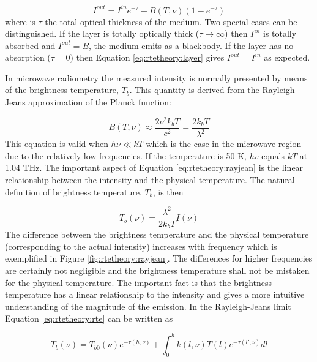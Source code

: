  \begin{equation}
   I^{out} = I^{in}e^{-\tau} + B(T,\nu)(1-e^{-\tau})
  \label{eq:rtetheory:layer}
 \end{equation}  
 where is $\tau$ the total optical thickness of the medium. Two
 special cases can be distinguished. If the layer is totally optically
 thick ($\tau \to \infty$) then $I^{in}$ is totally absorbed and
 $I^{out} = B$, the medium emits as a blackbody. If the layer has no
 absorption ($\tau=0$) then Equation \ref{eq:rtetheory:layer} gives
 $I^{out} = I^{in}$ as expected.
 
 In microwave radiometry the measured intensity is normally presented
 by means of the brightness temperature, $T_b$. This quantity is
 derived from the Rayleigh-Jeans approximation of the Planck function:

 \begin{equation}
   B(T,\nu) \approx \frac{2\nu^2k_bT}{c^2} = \frac{2k_bT}{\lambda^2}
  \label{eq:rtetheory:rayjean}
 \end{equation}  
 This equation is valid when $h\nu \ll kT$ which is the case in the
 microwave region due to the relatively low frequencies. If the
 temperature is 50 K, $hv$ equals $kT$ at 1.04 THz. The important
 aspect of Equation \ref{eq:rtetheory:rayjean} is the linear relationship
 between the intensity and the physical temperature. The natural
 definition of brightness temperature, $T_b$, is then

 \begin{equation}
   T_b(\nu) = \frac{\lambda^2}{2k_bT} I(\nu)
  \label{eq:rtetheory:tb}
 \end{equation}  
 The difference between the brightness temperature and the physical
 temperature (corresponding to the actual intensity) increases with
 frequency which is exemplified in Figure \ref{fig:rtetheory:rayjean}. The
 differences for higher frequencies are certainly not negligible and
 the brightness temperature shall not be mistaken for the physical
 temperature. The important fact is that the brightness temperature
 has a linear relationship to the intensity and gives a more intuitive
 understanding of the magnitude of the emission. In the Rayleigh-Jeans
 limit Equation \ref{eq:rtetheory:rte} can be written as

 \begin{equation}
   T_b(\nu) = T_{b0}(\nu)e^{-\tau(h,\nu)} + 
     \int^h_0{k(l,\nu)T(l) e^{-\tau(l',\nu)} dl}
  \label{eq:rtetheory:rte_tb}
 \end{equation}  

